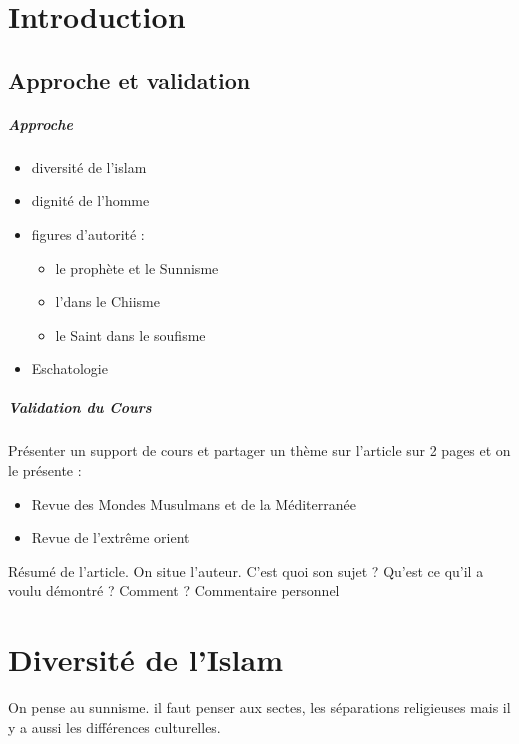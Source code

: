 \chapter*{Introduction}
\section{Approche et validation}

\paragraph{Approche}
\begin{itemize}
\item diversité de l'islam
\item dignité de l'homme
\item figures d'autorité : 
\begin{itemize}
\item le prophète et le Sunnisme
\item l'\imam dans le Chiisme
\item le Saint dans le soufisme
\end{itemize}
\item Eschatologie
\end{itemize}

\paragraph{Validation du Cours}Présenter un support de cours et partager un thème sur l'article sur 2 pages et on le présente : 
\begin{itemize}
\item Revue des Mondes Musulmans et de la Méditerranée
\item Revue de l'extrême orient
\end{itemize}
Résumé de l'article. On situe l'auteur. C'est quoi son sujet ? Qu'est ce qu'il a voulu démontré ? Comment ? 
Commentaire personnel 


\chapter{Diversité de l'Islam}

On pense au sunnisme. il faut penser aux sectes, les séparations religieuses mais il y a aussi les différences culturelles.
